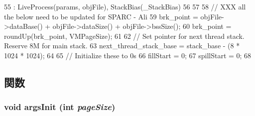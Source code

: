 \begin{DoxyCode}
55     : LiveProcess(params, objFile), StackBias(_StackBias)
56 {
57 
58     // XXX all the below need to be updated for SPARC - Ali
59     brk_point = objFile->dataBase() + objFile->dataSize() + objFile->bssSize();
60     brk_point = roundUp(brk_point, VMPageSize);
61 
62     // Set pointer for next thread stack.  Reserve 8M for main stack.
63     next_thread_stack_base = stack_base - (8 * 1024 * 1024);
64 
65     // Initialize these to 0s
66     fillStart = 0;
67     spillStart = 0;
68 }
\end{DoxyCode}


\subsection{関数}
\hypertarget{classSparcLiveProcess_a2415a441aed245469460cac91152385e}{
\subsubsection[{argsInit}]{\setlength{\rightskip}{0pt plus 5cm}void argsInit (int {\em pageSize})}}
\label{classSparcLiveProcess_a2415a441aed245469460cac91152385e}



